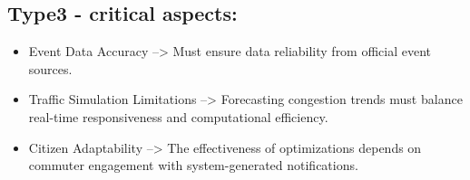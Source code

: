 \documentclass[a4paper,12pt]{article}
\begin{document}
\subsection*{Type3 - critical aspects:}
\begin{itemize}
    \item Event Data Accuracy --> Must ensure data reliability from official event sources.
    \item Traffic Simulation Limitations --> Forecasting congestion trends must balance real-time responsiveness and computational efficiency.
    \item Citizen Adaptability --> The effectiveness of optimizations depends on commuter engagement with system-generated notifications.
\end{itemize}
\end{document}
